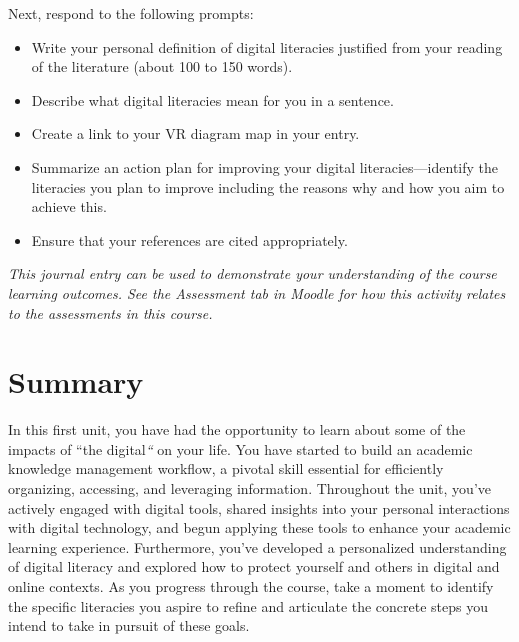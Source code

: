 \documentclass[
  letterpaper,
  DIV=11,
  numbers=noendperiod]{scrreprt}
\providecommand{\tightlist}{%
  \setlength{\itemsep}{0pt}\setlength{\parskip}{0pt}}\usepackage{longtable,booktabs,array}
\begin{document}
\begin{tcolorbox}
\begin{figure}[H]
\end{figure}%

Next, respond to the following prompts:

\begin{itemize}
\tightlist
\item
  Write your personal definition of digital literacies justified from
  your reading of the literature (about 100 to 150 words).
\item
  Describe what digital literacies mean for you in a sentence.
\item
  Create a link to your VR diagram map in your entry.
\item
  Summarize an action plan for improving your digital
  literacies---identify the literacies you plan to improve including the
  reasons why and how you aim to achieve this.
\item
  Ensure that your references are cited appropriately.
\end{itemize}

\begin{tcolorbox}[enhanced jigsaw, toprule=.15mm, colback=white, colframe=quarto-callout-note-color-frame, arc=.35mm, opacityback=0, breakable, rightrule=.15mm, bottomrule=.15mm, leftrule=.75mm, left=2mm]

\emph{This journal entry can be used to demonstrate your understanding
of the course learning outcomes. See the Assessment tab in Moodle for
how this activity relates to the assessments in this course.}

\end{tcolorbox}

\end{tcolorbox}

\section*{Summary}\label{summary}


In this first unit, you have had the opportunity to learn about some of
the impacts of ``the digital\emph{``} on your life. You have started to
build an academic knowledge management workflow, a pivotal skill
essential for efficiently organizing, accessing, and leveraging
information. Throughout the unit, you've actively engaged with digital
tools, shared insights into your personal interactions with digital
technology, and begun applying these tools to enhance your academic
learning experience. Furthermore, you've developed a personalized
understanding of digital literacy and explored how to protect yourself
and others in digital and online contexts. As you progress through the
course, take a moment to identify the specific literacies you aspire to
refine and articulate the concrete steps you intend to take in pursuit
of these goals.
\end{document}
